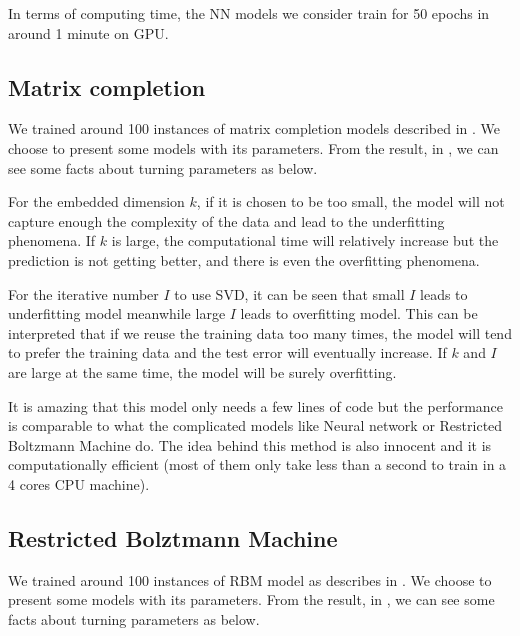 \documentclass[bj, preprint]{imsart}
\begin{document}
In terms of computing time, the NN models we consider train for 50 epochs in around 1 minute on GPU.





\subsection{Matrix completion}\label{sebsec:results.svd}
We trained around 100 instances of matrix completion models described in . We choose to present some models with its parameters. From the result, in , we can see some facts about turning parameters as below.

For the embedded dimension $k$, if it is chosen to be too small, the model will not capture enough the complexity of the data and lead to the underfitting phenomena. If $k$ is large, the computational time will relatively increase but the prediction is not getting better, and there is even the overfitting phenomena. 

For the iterative number $I$ to use SVD, it can be seen that small $I$ leads to underfitting model meanwhile large $I$ leads to overfitting model. This can be interpreted that if we reuse the training data too many times, the model will tend to prefer the training data and the test error will eventually increase. If $k$ and $I$ are large at the same time, the model will be surely overfitting.

It is amazing that this model only needs a few lines of code but the performance is comparable to what the complicated models like Neural network or Restricted Boltzmann Machine do. The idea behind this method is also innocent and it is computationally efficient (most of them only take less than a second to train in a 4 cores CPU machine).     



\subsection{Restricted Bolztmann Machine}\label{sebsec:results.rbm}

We trained around 100 instances of RBM model as describes in . We choose to present some models with its parameters. From the result, in , we can see some facts about turning parameters as below.
\end{document}
